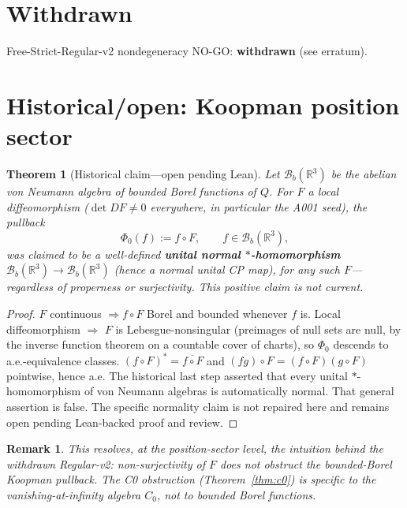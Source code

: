 \documentclass[11pt]{article}
\newtheorem{theorem}{Theorem}
\newtheorem{remark}{Remark}
\begin{document}
\section{Withdrawn}
Free-Strict-Regular-v2 nondegeneracy NO-GO: \textbf{withdrawn} (see erratum).

\section{Historical/open: Koopman position sector}
\begin{theorem}[Historical claim---open pending Lean]
Let \(\mathcal{B}_b(\mathbb{R}^3)\) be the abelian von Neumann algebra of
bounded Borel functions of \(Q\). For \(F\) a local diffeomorphism
(\(\det DF\neq 0\) everywhere, in particular the A001 seed), the pullback
\[
\Phi_0(f):=f\circ F,
\qquad f\in\mathcal{B}_b(\mathbb{R}^3),
\]
was claimed to be a well-defined \textbf{unital normal \(*\)-homomorphism}
\(\mathcal{B}_b(\mathbb{R}^3)\to\mathcal{B}_b(\mathbb{R}^3)\) (hence a normal
unital CP map), for \emph{any} such \(F\)---regardless of properness or
surjectivity. This positive claim is not current.
\end{theorem}
\begin{proof}
\(F\) continuous \(\Rightarrow f\circ F\) Borel and bounded whenever \(f\) is.
Local diffeomorphism \(\Rightarrow\) \(F\) is Lebesgue-nonsingular (preimages
of null sets are null, by the inverse function theorem on a countable cover
of charts), so \(\Phi_0\) descends to a.e.-equivalence classes.
\((f\circ F)^*=\overline{f\circ F}\) and \((fg)\circ F=(f\circ F)(g\circ F)\)
pointwise, hence a.e. The historical last step asserted that every unital
\(*\)-homomorphism of von Neumann algebras is automatically normal. That
general assertion is false. The specific normality claim is not repaired
here and remains open pending Lean-backed proof and review.
\end{proof}

\begin{remark}
This resolves, at the position-sector level, the intuition behind the
withdrawn Regular-v2: non-surjectivity of \(F\) does \emph{not} obstruct the
bounded-Borel Koopman pullback. The C0 obstruction (Theorem~\ref{thm:c0}) is
specific to the \emph{vanishing-at-infinity} algebra \(C_0\), not to bounded
Borel functions.
\end{remark}
\end{document}
